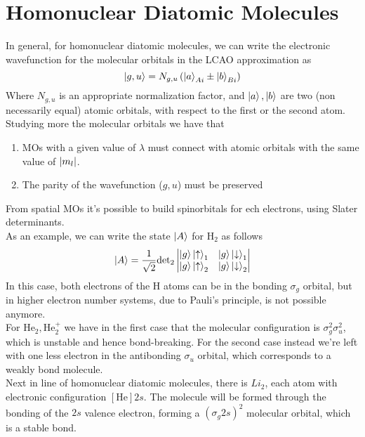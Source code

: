 \documentclass[../qm.tex]{subfiles}
\begin{document}
	\section{Homonuclear Diatomic Molecules}
	In general, for homonuclear diatomic molecules, we can write the electronic wavefunction for the molecular orbitals in the LCAO approximation as
	\begin{equation*}
		\ket{g,u}=N_{g,u}\left( \ket{a}_{Ai}\pm\ket{b}_{Bi} \right)
	\end{equation*}
	Where $N_{g,u}$ is an appropriate normalization factor, and $\ket{a},\ket{b}$ are two (non necessarily equal) atomic orbitals, with respect to the first or the second atom.\\
	Studying more the molecular orbitals we have that
	\begin{enumerate}
	\item MOs with a given value of $\lambda$ must connect with atomic orbitals with the same value of $\abs{m_l}$.
	\item The parity of the wavefunction ($g,u$) must be preserved
	\end{enumerate}
	From spatial MOs it's possible to build spinorbitals for ech electrons, using Slater determinants.\\
	As an example, we can write the state $\ket{A}$ for $\mathrm{H}_2$ as follows
	\begin{equation}
		\ket{A}=\frac{1}{\sqrt{2}}\mathrm{det}_2\left|\begin{matrix}
				\ket{g}\ket{\uparrow}_1&\ket{g}\ket{\downarrow}_1\\
				\ket{g}\ket{\uparrow}_2&\ket{g}\ket{\downarrow}_2
			\end{matrix}\right|
		\label{eq:ketah2matrix}
	\end{equation}
	In this case, both electrons of the $\mathrm{H}$ atoms can be in the bonding $\sigma_g$ orbital, but in higher electron number systems, due to Pauli's principle, is not possible anymore.\\
	For $\mathrm{He}_2,\mathrm{He}_2^+$ we have in the first case that the molecular configuration is $\sigma_g^2\sigma_u^2$, which is unstable and hence bond-breaking. For the second case instead we're left with one less electron in the antibonding $\sigma_u$ orbital, which corresponds to a weakly bond molecule.\\
	Next in line of homonuclear diatomic molecules, there is $Li_2$, each atom with electronic configuration $[\mathrm{He}]2s$. The molecule will be formed through the bonding of the $2s$ valence electron, forming a $\left( \sigma_g 2s \right)^2$ molecular orbital, which is a stable bond.\\
\end{document}

